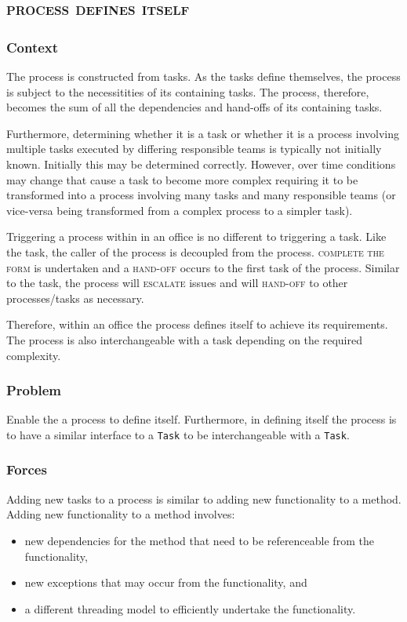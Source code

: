 \documentclass[prodmode]{style/acmlarge}
\begin{document}
\subsection{\textsc{\textbf{process defines itself}}}

\subsubsection*{Context} The process is constructed from tasks.  As the tasks
define themselves, the process is subject to the necessitities of its containing
tasks.  The process, therefore, becomes the sum of all the dependencies and
hand-offs of its containing tasks.

Furthermore, determining whether it is a task or whether it is a process involving
multiple tasks executed by differing responsible teams is typically not
initially known.  Initially this may be determined correctly.  However, over
time conditions may change that cause a task to become more complex requiring
it to be transformed into a process involving many tasks and many responsible
teams (or vice-versa being transformed from a complex process to a simpler task).

Triggering a process within in an office is no different to triggering a task.
Like the task, the caller of the process is decoupled from the process.
\textsc{complete the form} is undertaken and a \textsc{hand-off} occurs to the
first task of the process.  Similar to the task, the process will
\textsc{escalate} issues and will \textsc{hand-off} to other processes/tasks as
necessary.

Therefore, within an office the process defines itself to achieve its
requirements.  The process is also interchangeable with a task depending on the
required complexity.

\subsubsection*{Problem} Enable the a process to define itself.  Furthermore, in
defining itself the process is to have a similar interface to a \texttt{Task} to
be interchangeable with a \texttt{Task}.

\subsubsection*{Forces} Adding new tasks to a process is similar to adding new
functionality to a method.  Adding new functionality to a method involves:
\begin{itemize}
  \item new dependencies for the method that need to be referenceable from the functionality,
  \item new exceptions that may occur from the functionality, and
  \item a different threading model to efficiently undertake the functionality. 
\end{itemize}
\end{document}
